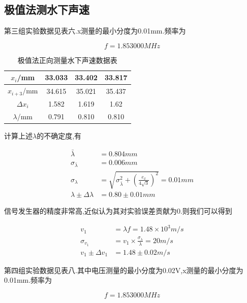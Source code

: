 \documentclass[a4paper,10pt,notitlepage]{article}
\begin{document}
\subsection{极值法测水下声速}

	第三组实验数据见表六.x测量的最小分度为0.01mm.频率为
	
\begin{equation}
	f = 1.853000 MHz
\end{equation}

\begin{table}[htbp]
\centering

	\begin{tabular}{|c|c|c|c|}
	\hline
	$x_{i}$/mm & 33.033 & 33.402 & 33.817 \\
	\hline
	$x_{i+3}$/mm & 34.615 & 35.021 & 35.437 \\
	\hline
	$\Delta x_i$ & 1.582 & 1.619 & 1.62 \\
	\hline
	$\lambda$/mm & 0.791 & 0.810 & 0.810 \\
	\hline
	\end{tabular}
	\caption{极值法正向测量水下声速数据表}

\end{table}

	计算上述$\lambda$的不确定度,有 
	
\begin{align}
	\bar{\lambda} &= 0.804mm \\
	\sigma_{\bar{\lambda}} &= 0.006mm \\
	\sigma_\lambda &= \sqrt{\sigma_{\bar{\lambda}} ^ 2 + (\frac{e_x}{4\sqrt{3}})^2}  = 0.01mm \\
	\lambda \pm \Delta \lambda &= 0.80 \pm 0.01 mm
\end{align}

	信号发生器的精度非常高,近似认为其对实验误差贡献为0.则我们可以得到 
	
\begin{align}
	v_1 &= \lambda f = 1.48 \times 10^3 m/s \\
	\sigma_{v_1} &= v_1 \times \frac{\sigma_{\lambda}}{\lambda} = 20 m/s \\
	v_1 \pm \Delta v_1 &= 1.48 \pm 0.02  m/s
\end{align}

	第四组实验数据见表八.其中电压测量的最小分度为0.02V,x测量的最小分度为0.01mm.频率为
	
\begin{equation}
	f = 1.853000 MHz
\end{equation}
\end{document}

